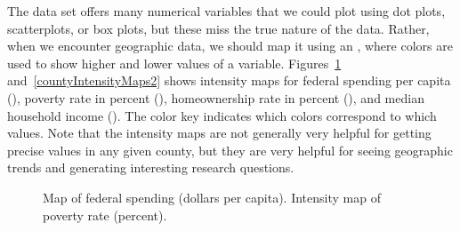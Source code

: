 The  data set offers many numerical variables that we could plot using dot plots, scatterplots, or box plots, but these miss the true nature of the data. Rather, when we encounter geographic data, we should map it using an , where colors are used to show higher and lower values of a variable. Figures~\ref{countyIntensityMaps1} and~\ref{countyIntensityMaps2} shows intensity maps for federal spending per capita (), poverty rate in percent (), homeownership rate in percent (), and median household income (). The color key indicates which colors correspond to which values. Note that the intensity maps are not generally very helpful for getting precise values in any given county, but they are very helpful for seeing geographic trends and generating interesting research questions.

\begin{figure}
\centering
{}
\caption{ Map of federal spending (dollars per capita).  Intensity map of poverty rate (percent).}
\label{countyIntensityMaps1}
\end{figure}

